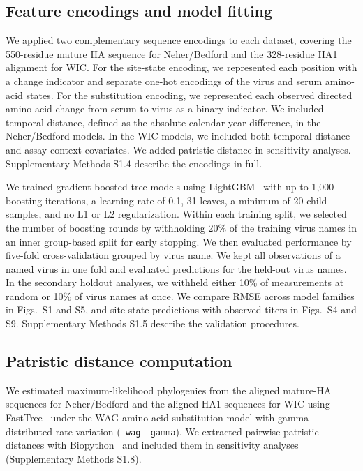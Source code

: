 \documentclass[12pt]{article}
\begin{document}
\subsection{Feature encodings and model fitting}

We applied two complementary sequence encodings to each dataset, covering the 550-residue mature HA sequence for Neher/Bedford and the 328-residue HA1 alignment for WIC. For the site-state encoding, we represented each position with a change indicator and separate one-hot encodings of the virus and serum amino-acid states. For the substitution encoding, we represented each observed directed amino-acid change from serum to virus as a binary indicator. We included temporal distance, defined as the absolute calendar-year difference, in the Neher/Bedford models. In the WIC models, we included both temporal distance and assay-context covariates. We added patristic distance in sensitivity analyses. Supplementary Methods S1.4 describe the encodings in full.

We trained gradient-boosted tree models using LightGBM~\cite{Ke2017LightGBM} with up to 1{,}000 boosting iterations, a learning rate of 0.1, 31 leaves, a minimum of 20 child samples, and no L1 or L2 regularization. Within each training split, we selected the number of boosting rounds by withholding 20\% of the training virus names in an inner group-based split for early stopping. We then evaluated performance by five-fold cross-validation grouped by virus name. We kept all observations of a named virus in one fold and evaluated predictions for the held-out virus names. In the secondary holdout analyses, we withheld either 10\% of measurements at random or 10\% of virus names at once. We compare RMSE across model families in Figs.~S1 and S5, and site-state predictions with observed titers in Figs.~S4 and S9. Supplementary Methods S1.5 describe the validation procedures.

\subsection{Patristic distance computation}

We estimated maximum-likelihood phylogenies from the aligned mature-HA sequences for Neher/Bedford and the aligned HA1 sequences for WIC using FastTree~\cite{Price2010PLoSOne} under the WAG amino-acid substitution model with gamma-distributed rate variation (\texttt{-wag -gamma}). We extracted pairwise patristic distances with Biopython~\cite{cock2009biopython} and included them in sensitivity analyses (Supplementary Methods S1.8).
\end{document}
